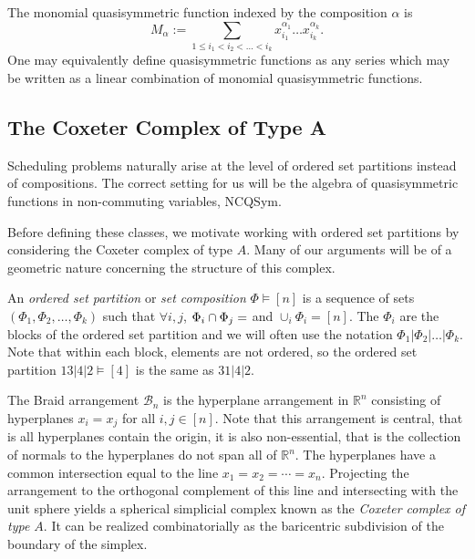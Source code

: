 \documentclass[12pt,reqno]{amsart}
\numberwithin{definition}{section}
\theoremstyle{definition}
\begin{document}
The monomial quasisymmetric function indexed by the composition $\alpha$ is 
$$M_{\alpha} := \sum_{1 \leq i_1 < i_2 < \ldots < i_k}
x_{i_1}^{\alpha_1} \ldots x_{i_k}^{\alpha_k}.$$  One may equivalently
define quasisymmetric functions as any series which may be written as a
linear combination of monomial quasisymmetric functions.




\subsection{The Coxeter Complex of Type A}
Scheduling problems naturally arise at the level of ordered set partitions instead of
compositions.  The correct setting for us will be the algebra of  
quasisymmetric functions in non-commuting variables, NCQSym.

Before defining these classes, we motivate working with ordered set
partitions by considering the Coxeter complex of type $A$.  Many of
our arguments will be of a geometric nature concerning the structure
of this complex.


An \emph{ordered set partition} or \emph{set composition} $\Phi \vDash
[n]$ is a sequence of sets $(\Phi_1, \Phi_2, \ldots, \Phi_k)$ such that $\forall
i,j$, $ \Phi_i \cap \Phi_j = \empty$ and $\cup_i \Phi_i = [n]$.  The $\Phi_i$ are the
blocks of the ordered set partition and we will often use the notation
$\Phi_1| \Phi_2| \ldots| \Phi_k$.  Note that within each block, elements are
not ordered, so the ordered set partition $13|4|2 \vDash [4]$ is the
same as $31|4|2$.



The Braid arrangement $\mathcal{B}_n$ is the hyperplane arrangement in
$\mathbb{R}^n$ consisting of hyperplanes $x_i = x_j$ for all $i,j \in [n]$.
Note that this arrangement is central, that is all hyperplanes contain
the origin, it is also non-essential, that is the collection of
normals to the hyperplanes do not span all of $\mathbb{R}^n$.  The
hyperplanes have a common intersection equal to the line $x_1 = x_2 = \cdots
= x_n$.  Projecting the arrangement to the orthogonal complement of
this line and intersecting with the unit sphere yields a spherical
simplicial complex known as the \emph{Coxeter complex of type $A$}.
It can be realized combinatorially as the baricentric subdivision of the
boundary of the simplex. 
\end{document}
